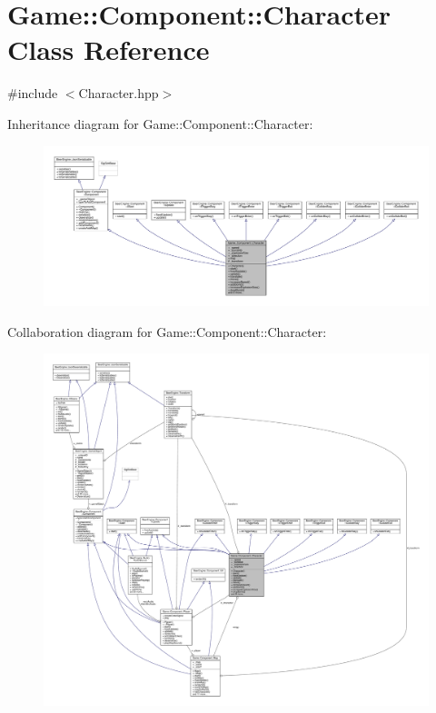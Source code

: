 \hypertarget{class_game_1_1_component_1_1_character}{}\section{Game\+:\+:Component\+:\+:Character Class Reference}
\label{class_game_1_1_component_1_1_character}


{\ttfamily \#include $<$Character.\+hpp$>$}



Inheritance diagram for Game\+:\+:Component\+:\+:Character\+:\nopagebreak
\begin{figure}[H]
\begin{center}
\leavevmode
\includegraphics[width=350pt]{class_game_1_1_component_1_1_character__inherit__graph}
\end{center}
\end{figure}


Collaboration diagram for Game\+:\+:Component\+:\+:Character\+:
\nopagebreak
\begin{figure}[H]
\begin{center}
\leavevmode
\includegraphics[width=350pt]{class_game_1_1_component_1_1_character__coll__graph}
\end{center}
\end{figure}
